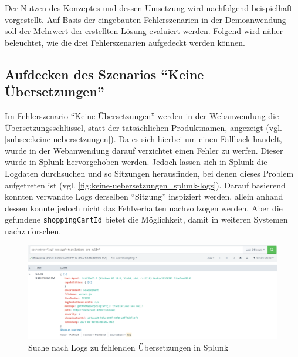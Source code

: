 
Der Nutzen des Konzeptes und dessen Umsetzung wird nachfolgend beispielhaft vorgestellt. Auf Basis der eingebauten Fehlerszenarien in der Demoanwendung soll der Mehrwert der erstellten Lösung evaluiert werden. Folgend wird näher beleuchtet, wie die drei Fehlerszenarien aufgedeckt werden können.

\subsection{Aufdecken des Szenarios \enquote{Keine Übersetzungen}}

Im Fehlerszenario \enquote{Keine Übersetzungen} werden in der Webanwendung die Übersetzungsschlüssel, statt der tatsächlichen Produktnamen, angezeigt (vgl. \autoref{subsec:keine-uebersetzungen}). Da es sich hierbei um einen Fallback handelt, wurde in der Webanwendung darauf verzichtet einen Fehler zu werfen. Dieser würde in Splunk hervorgehoben werden. Jedoch lassen sich in Splunk die Logdaten durchsuchen und so Sitzungen herausfinden, bei denen dieses Problem aufgetreten ist (vgl. \autoref{fig:keine-uebersetzungen_splunk-logs}). Darauf basierend konnten verwandte Logs derselben \enquote{Sitzung} inspiziert werden, allein anhand dessen konnte jedoch nicht das Fehlverhalten nachvollzogen werden. Aber die gefundene \texttt{shoppingCartId} bietet die Möglichkeit, damit in weiteren Systemen nachzuforschen.

\begin{figure}[H]
	\centering
	\includegraphics[width=1.00\linewidth]{img/05_ergebnis/keine-uebersetzungen_splunk-logs.png}
	\caption{Suche nach Logs zu fehlenden Übersetzungen in Splunk}
	\label{fig:keine-uebersetzungen_splunk-logs}
\end{figure}

